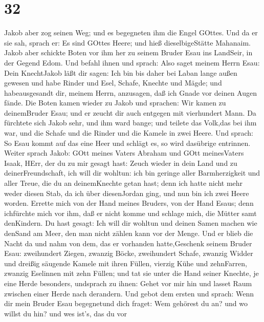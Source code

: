 \hypertarget{section-31}{%
\section{32}\label{section-31}}

 Jakob aber zog seinen Weg; und es begegneten ihm die Engel
GOttes.  Und da er sie sah, sprach er: Es sind GOttes Heere;
und hieß dieselbigeStätte Mahanaim.  Jakob aber schickte
Boten vor ihm her zu seinem Bruder Esau ins LandSeir, in der Gegend
Edom.  Und befahl ihnen und sprach: Also saget meinem Herrn
Esau: Dein KnechtJakob läßt dir sagen: Ich bin bis daher bei Laban lange
außen gewesen  und habe Rinder und Esel, Schafe, Knechte und
Mägde; und habeausgesandt dir, meinem Herrn, anzusagen, daß ich Gnade
vor deinen Augen fände.  Die Boten kamen wieder zu Jakob und
sprachen: Wir kamen zu deinemBruder Esau; und er zeucht dir auch
entgegen mit vierhundert Mann.  Da fürchtete sich Jakob
sehr, und ihm ward bange; und teilete das Volk,das bei ihm war, und die
Schafe und die Rinder und die Kamele in zwei Heere.  Und
sprach: So Esau kommt auf das eine Heer und schlägt es, so wird
dasübrige entrinnen.  Weiter sprach Jakob: GOtt meines
Vaters Abraham und GOtt meinesVaters Isaak, HErr, der du zu mir gesagt
hast: Zeuch wieder in dein Land und zu deinerFreundschaft, ich will dir
wohltun:  ich bin geringe aller Barmherzigkeit und aller
Treue, die du an deinemKnechte getan hast; denn ich hatte nicht mehr
weder diesen Stab, da ich über diesenJordan ging, und nun bin ich zwei
Heere worden.  Errette mich von der Hand meines Bruders,
von der Hand Esaus; denn ichfürchte mich vor ihm, daß er nicht komme und
schlage mich, die Mütter samt denKindern.  Du hast gesagt:
Ich will dir wohltun und deinen Samen machen wie denSand am Meer, den
man nicht zählen kann vor der Menge.  Und er blieb die
Nacht da und nahm von dem, das er vorhanden hatte,Geschenk seinem Bruder
Esau:  zweihundert Ziegen, zwanzig Böcke, zweihundert
Schafe, zwanzig Widder  und dreißig säugende Kamele mit
ihren Füllen, vierzig Kühe und zehnFarren, zwanzig Eselinnen mit zehn
Füllen;  und tat sie unter die Hand seiner Knechte, je eine
Herde besonders, undsprach zu ihnen: Gehet vor mir hin und lasset Raum
zwischen einer Herde nach derandern.  Und gebot dem ersten
und sprach: Wenn dir mein Bruder Esau begegnetund dich fraget: Wem
gehörest du an? und wo willst du hin? und wes ist's, das du vor
